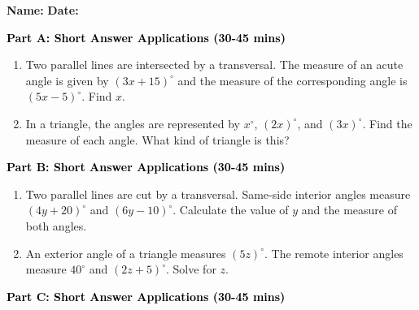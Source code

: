 \documentclass[12pt, letterpaper, fleqn]{article}
\begin{document}
\textbf{Name:} \underline{\hspace{5cm}}
\hfill
\textbf{Date:} \underline{\hspace{3cm}}\\


\begin{tcolorbox}[colback=customteal!20]
\large\textcolor{black}{\textbf{Part A: Short Answer Applications (30-45 mins)}}
\end{tcolorbox}

\vspace{3mm}

\begin{enumerate}[itemsep=4.2cm, leftmargin=0.6cm]
\item Two parallel lines are intersected by a transversal. The measure of an acute angle is given by $(3x + 15)^\circ$ and the measure of the corresponding angle is $(5x - 5)^\circ$. Find $x$.
\item In a triangle, the angles are represented by $x^\circ$, $(2x)^\circ$, and $(3x)^\circ$. Find the measure of each angle. What kind of triangle is this?
\end{enumerate}

\newpage

\begin{tcolorbox}[colback=customteal!20]
\large\textcolor{black}{\textbf{Part B: Short Answer Applications (30-45 mins)}}
\end{tcolorbox}

\vspace{3mm}

\begin{enumerate}[itemsep=4.2cm, leftmargin=0.6cm, resume]
\item Two parallel lines are cut by a transversal. Same-side interior angles measure $(4y + 20)^\circ$ and $(6y - 10)^\circ$. Calculate the value of $y$ and the measure of both angles.
\item An exterior angle of a triangle measures $(5z)^\circ$. The remote interior angles measure $40^\circ$ and $(2z + 5)^\circ$. Solve for $z$.
\end{enumerate}

\newpage

\begin{tcolorbox}[colback=customteal!20]
\large\textcolor{black}{\textbf{Part C: Short Answer Applications (30-45 mins)}}
\end{tcolorbox}
\end{document}

